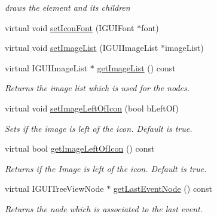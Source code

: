 \begin{DoxyCompactItemize}
\begin{DoxyCompactList}\small\item\em draws the element and its children \end{DoxyCompactList}\item 
virtual void \hyperlink{classirr_1_1gui_1_1_c_g_u_i_tree_view_a6aa21ae4facdf8b4b17fda51155f1028}{set\-Icon\-Font} (I\-G\-U\-I\-Font $\ast$font)
\item 
virtual void \hyperlink{classirr_1_1gui_1_1_c_g_u_i_tree_view_a50f250abc90072763b7a9fb42866f618}{set\-Image\-List} (I\-G\-U\-I\-Image\-List $\ast$image\-List)
\item 
\hypertarget{classirr_1_1gui_1_1_c_g_u_i_tree_view_a94fd25dce8d98bad49eac90f2d7d6b41}{virtual I\-G\-U\-I\-Image\-List $\ast$ \hyperlink{classirr_1_1gui_1_1_c_g_u_i_tree_view_a94fd25dce8d98bad49eac90f2d7d6b41}{get\-Image\-List} () const }\label{classirr_1_1gui_1_1_c_g_u_i_tree_view_a94fd25dce8d98bad49eac90f2d7d6b41}

\begin{DoxyCompactList}\small\item\em Returns the image list which is used for the nodes. \end{DoxyCompactList}\item 
\hypertarget{classirr_1_1gui_1_1_c_g_u_i_tree_view_ada425ba869b332c30f64f154548c9234}{virtual void \hyperlink{classirr_1_1gui_1_1_c_g_u_i_tree_view_ada425ba869b332c30f64f154548c9234}{set\-Image\-Left\-Of\-Icon} (bool b\-Left\-Of)}\label{classirr_1_1gui_1_1_c_g_u_i_tree_view_ada425ba869b332c30f64f154548c9234}

\begin{DoxyCompactList}\small\item\em Sets if the image is left of the icon. Default is true. \end{DoxyCompactList}\item 
\hypertarget{classirr_1_1gui_1_1_c_g_u_i_tree_view_a23dd18601597bcddb828aabb927cfabd}{virtual bool \hyperlink{classirr_1_1gui_1_1_c_g_u_i_tree_view_a23dd18601597bcddb828aabb927cfabd}{get\-Image\-Left\-Of\-Icon} () const }\label{classirr_1_1gui_1_1_c_g_u_i_tree_view_a23dd18601597bcddb828aabb927cfabd}

\begin{DoxyCompactList}\small\item\em Returns if the Image is left of the icon. Default is true. \end{DoxyCompactList}\item 
\hypertarget{classirr_1_1gui_1_1_c_g_u_i_tree_view_a6ebcb561a9c015b4e81ccf15d1f638d7}{virtual I\-G\-U\-I\-Tree\-View\-Node $\ast$ \hyperlink{classirr_1_1gui_1_1_c_g_u_i_tree_view_a6ebcb561a9c015b4e81ccf15d1f638d7}{get\-Last\-Event\-Node} () const }\label{classirr_1_1gui_1_1_c_g_u_i_tree_view_a6ebcb561a9c015b4e81ccf15d1f638d7}

\begin{DoxyCompactList}\small\item\em Returns the node which is associated to the last event. \end{DoxyCompactList}\end{DoxyCompactItemize}
